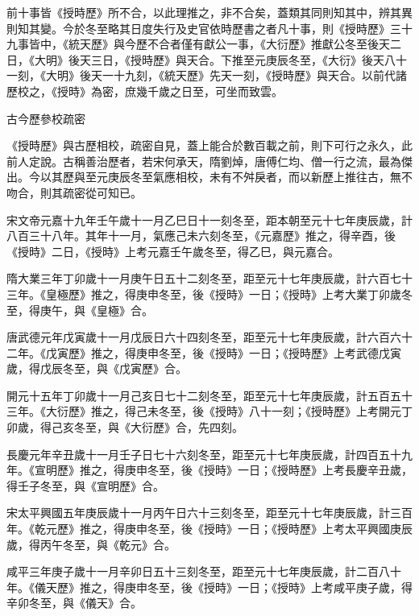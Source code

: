 \begin{pinyinscope}
 前十事皆《授時歷》所不合，以此理推之，非不合矣，蓋類其同則知其中，辨其異則知其變。今於冬至略其日度失行及史官依時歷書之者凡十事，則《授時歷》三十九事皆中，《統天歷》與今歷不合者僅有獻公一事，《大衍歷》推獻公冬至後天二日，《大明》後天三日，《授時歷》與天合。下推至元庚辰冬至，《大衍》後天八十一刻，《大明》後天一十九刻，《統天歷》先天一刻，《授時歷》與天合。以前代諸歷校之，《授時》為密，庶幾千歲之日至，可坐而致雲。



 古今歷參校疏密



 《授時歷》與古歷相校，疏密自見，蓋上能合於數百載之前，則下可行之永久，此前人定說。古稱善治歷者，若宋何承天，隋劉焯，唐傅仁均、僧一行之流，最為傑出。今以其歷與至元庚辰冬至氣應相校，未有不舛戾者，而以新歷上推往古，無不吻合，則其疏密從可知已。



 宋文帝元嘉十九年壬午歲十一月乙巳日十一刻冬至，距本朝至元十七年庚辰歲，計八百三十八年。其年十一月，氣應己未六刻冬至，《元嘉歷》推之，得辛酉，後《授時》二日，《授時》上考元嘉壬午歲冬至，得乙巳，與元嘉合。



 隋大業三年丁卯歲十一月庚午日五十二刻冬至，距至元十七年庚辰歲，計六百七十三年。《皇極歷》推之，得庚申冬至，後《授時》一日；《授時》上考大業丁卯歲冬至，得庚午，與《皇極》合。



 唐武德元年戊寅歲十一月戊辰日六十四刻冬至，距至元十七年庚辰歲，計六百六十二年。《戊寅歷》推之，得庚申冬至，後《授時》一日；《授時歷》上考武德戊寅歲，得戊辰冬至，與《戊寅歷》合。



 開元十五年丁卯歲十一月己亥日七十二刻冬至，距至元十七年庚辰歲，計五百五十三年。《大衍歷》推之，得己未冬至，後《授時》八十一刻；《授時歷》上考開元丁卯歲，得己亥冬至，與《大衍歷》合，先四刻。



 長慶元年辛丑歲十一月壬子日七十六刻冬至，距至元十七年庚辰歲，計四百五十九年。《宣明歷》推之，得庚申冬至，後《授時》一日；《授時歷》上考長慶辛丑歲，得壬子冬至，與《宣明歷》合。



 宋太平興國五年庚辰歲十一月丙午日六十三刻冬至，距至元十七年庚辰歲，計三百年。《乾元歷》推之，得庚申冬至，後《授時》一日；《授時歷》上考太平興國庚辰歲，得丙午冬至，與《乾元》合。



 咸平三年庚子歲十一月辛卯日五十三刻冬至，距至元十七年庚辰歲，計二百八十年。《儀天歷》推之，得庚申冬至，後《授時》一日；《授時》上考咸平庚子歲，得辛卯冬至，與《儀天》合。




\end{pinyinscope}
